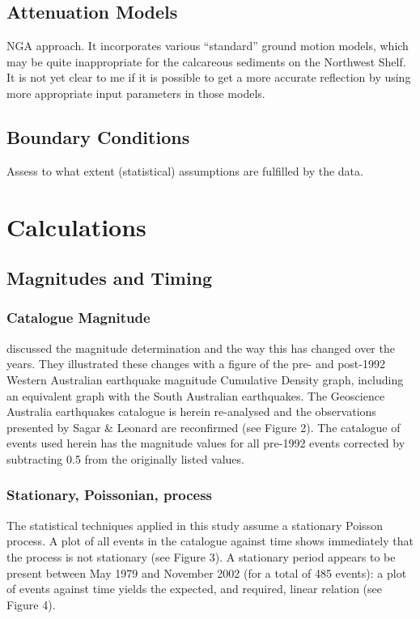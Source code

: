 \documentclass{report}
\begin{document}
\section{Attenuation Models}

 NGA approach. It incorporates
various ``standard'' ground motion models, which may be quite
inappropriate for the calcareous sediments on the Northwest Shelf. It
is not yet clear to me if it is possible to get a more accurate
reflection by using more appropriate input parameters in those models.

\section{Boundary Conditions}

Assess to what extent (statistical) assumptions are fulfilled by
the data.

\chapter{Calculations}
\section{Magnitudes and Timing}
\subsection{Catalogue Magnitude}

 discussed the magnitude determination
and the way this has changed over the years. They illustrated these
changes with a figure of the pre- and post-1992 Western Australian
earthquake magnitude Cumulative Density graph, including an equivalent
graph with the South Australian earthquakes. The Geoscience Australia
earthquakes catalogue is herein re-analysed and the observations
presented by Sagar \& Leonard are reconfirmed (see Figure 2).  The
catalogue of events used herein has the magnitude values for all
pre-1992 events corrected by subtracting 0.5 from the originally
listed values.

\subsection{Stationary, Poissonian, process}

The statistical techniques applied in this study assume a
stationary Poisson process. A plot of all events in the catalogue
against time shows immediately that the process is not
stationary (see Figure 3). A stationary period appears to be
present between May 1979 and November 2002 (for a total of 485
events): a plot of events against time yields the expected, and
required, linear relation (see Figure 4).
\end{document}
